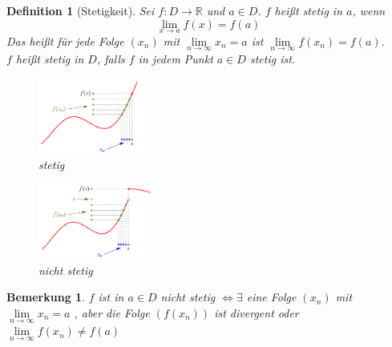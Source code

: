 \documentclass[a4paper,titlepage,oneside]{article}
\def\R{\ensuremath{\mathbb{R}} }
\renewcommand{\liminf}[2][n]{\ensuremath{\lim\limits_{#1 \rightarrow \infty}{#2}}}
\theoremstyle{thmstyle}
\newtheorem{defi}[satz]{Definition}
\newtheorem{bem}[satz]{Bemerkung}
\theoremstyle{subthmstyle}
\begin{document}
\begin{defi}[Stetigkeit]
Sei $f: D \to \R$ und $a \in D$. $f$ heißt stetig in $a$, wenn
\[\lim\limits_{x \to a}{f(x)} = f(a)\]
Das heißt für jede Folge $(x_n)$ mit $\liminf{x_n} = a$ ist $\liminf{f(x_n)} = f(a)$.\\
$f$ heißt stetig in $D$, falls $f$ in jedem Punkt $a \in D$ stetig ist.
\begin{figure}[ht]\centering
 \includegraphics[width=0.33\textwidth]{images/stetigefunktionbsp.gif}
\caption{stetig}
\end{figure}
\begin{figure}[ht]\centering
 \includegraphics[width=0.33\textwidth]{images/nichtstetigefunktionbsp.gif}
\caption{nicht stetig}
\end{figure}
\end{defi}

\begin{bem}
$f$ ist in $a \in D$ nicht stetig $\Leftrightarrow \exists$ eine Folge $(x_n)$ mit $\liminf{x_n} = a$ , aber die Folge $(f(x_n))$ ist divergent oder $\liminf{f(x_n)} \ne f(a)$
\end{bem}
\end{document}
